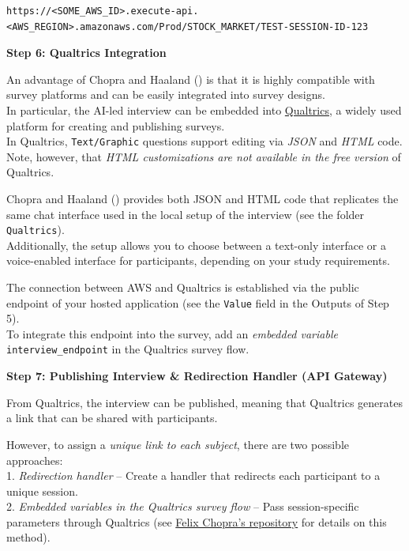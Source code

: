 \documentclass[
  letterpaper,
  DIV=11,
  numbers=noendperiod]{scrartcl}
\begin{document}
\begin{verbatim}
https://<SOME_AWS_ID>.execute-api.<AWS_REGION>.amazonaws.com/Prod/STOCK_MARKET/TEST-SESSION-ID-123
\end{verbatim}

\textbf{Step 6: Qualtrics Integration}

An advantage of Chopra and Haaland
() is that it is highly
compatible with survey platforms and can be easily integrated into
survey designs.\\
In particular, the AI-led interview can be embedded into
\href{https://login.qualtrics.com/login}{Qualtrics}, a widely used
platform for creating and publishing surveys.\\
In Qualtrics, \texttt{Text/Graphic} questions support editing via
\emph{JSON} and \emph{HTML} code. Note, however, that \emph{HTML
customizations are not available in the free version} of Qualtrics.

Chopra and Haaland () provides
both JSON and HTML code that replicates the same chat interface used in
the local setup of the interview (see the folder \texttt{Qualtrics}).\\
Additionally, the setup allows you to choose between a text-only
interface or a voice-enabled interface for participants, depending on
your study requirements.

The connection between AWS and Qualtrics is established via the public
endpoint of your hosted application (see the \texttt{Value} field in the
Outputs of Step 5).\\
To integrate this endpoint into the survey, add an \emph{embedded
variable} \texttt{interview\_endpoint} in the Qualtrics survey flow.

\textbf{Step 7: Publishing Interview \& Redirection Handler (API
Gateway)}

From Qualtrics, the interview can be published, meaning that Qualtrics
generates a link that can be shared with participants.

However, to assign a \emph{unique link to each subject}, there are two
possible approaches:\\
1. \emph{Redirection handler} -- Create a handler that redirects each
participant to a unique session.\\
2. \emph{Embedded variables in the Qualtrics survey flow} -- Pass
session-specific parameters through Qualtrics (see
\href{https://github.com/fchop/interviews}{Felix Chopra's repository}
for details on this method).
\end{document}

